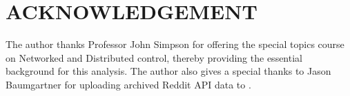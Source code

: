 \documentclass[letterpaper, 10 pt, conference]{ieeeconf}
\theoremstyle{definition}
\begin{document}







\section*{ACKNOWLEDGEMENT}
The author thanks Professor John Simpson for offering the special topics course on Networked and Distributed control, thereby providing the essential background for this analysis. The author also gives a special thanks to Jason Baumgartner for uploading archived Reddit API data to \cite{Software:RedditArchive}.


\end{document}
